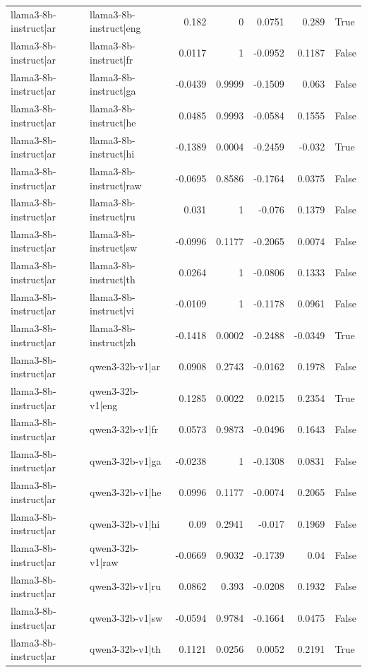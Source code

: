 \begin{table}
\begin{tabular}{l l r r r r l}
llama3-8b-instruct|ar & llama3-8b-instruct|eng & 0.182 & 0 & 0.0751 & 0.289 & True \\
llama3-8b-instruct|ar & llama3-8b-instruct|fr & 0.0117 & 1 & -0.0952 & 0.1187 & False \\
llama3-8b-instruct|ar & llama3-8b-instruct|ga & -0.0439 & 0.9999 & -0.1509 & 0.063 & False \\
llama3-8b-instruct|ar & llama3-8b-instruct|he & 0.0485 & 0.9993 & -0.0584 & 0.1555 & False \\
llama3-8b-instruct|ar & llama3-8b-instruct|hi & -0.1389 & 0.0004 & -0.2459 & -0.032 & True \\
llama3-8b-instruct|ar & llama3-8b-instruct|raw & -0.0695 & 0.8586 & -0.1764 & 0.0375 & False \\
llama3-8b-instruct|ar & llama3-8b-instruct|ru & 0.031 & 1 & -0.076 & 0.1379 & False \\
llama3-8b-instruct|ar & llama3-8b-instruct|sw & -0.0996 & 0.1177 & -0.2065 & 0.0074 & False \\
llama3-8b-instruct|ar & llama3-8b-instruct|th & 0.0264 & 1 & -0.0806 & 0.1333 & False \\
llama3-8b-instruct|ar & llama3-8b-instruct|vi & -0.0109 & 1 & -0.1178 & 0.0961 & False \\
llama3-8b-instruct|ar & llama3-8b-instruct|zh & -0.1418 & 0.0002 & -0.2488 & -0.0349 & True \\
llama3-8b-instruct|ar & qwen3-32b-v1|ar & 0.0908 & 0.2743 & -0.0162 & 0.1978 & False \\
llama3-8b-instruct|ar & qwen3-32b-v1|eng & 0.1285 & 0.0022 & 0.0215 & 0.2354 & True \\
llama3-8b-instruct|ar & qwen3-32b-v1|fr & 0.0573 & 0.9873 & -0.0496 & 0.1643 & False \\
llama3-8b-instruct|ar & qwen3-32b-v1|ga & -0.0238 & 1 & -0.1308 & 0.0831 & False \\
llama3-8b-instruct|ar & qwen3-32b-v1|he & 0.0996 & 0.1177 & -0.0074 & 0.2065 & False \\
llama3-8b-instruct|ar & qwen3-32b-v1|hi & 0.09 & 0.2941 & -0.017 & 0.1969 & False \\
llama3-8b-instruct|ar & qwen3-32b-v1|raw & -0.0669 & 0.9032 & -0.1739 & 0.04 & False \\
llama3-8b-instruct|ar & qwen3-32b-v1|ru & 0.0862 & 0.393 & -0.0208 & 0.1932 & False \\
llama3-8b-instruct|ar & qwen3-32b-v1|sw & -0.0594 & 0.9784 & -0.1664 & 0.0475 & False \\
llama3-8b-instruct|ar & qwen3-32b-v1|th & 0.1121 & 0.0256 & 0.0052 & 0.2191 & True \\

\end{tabular}
\end{table}
